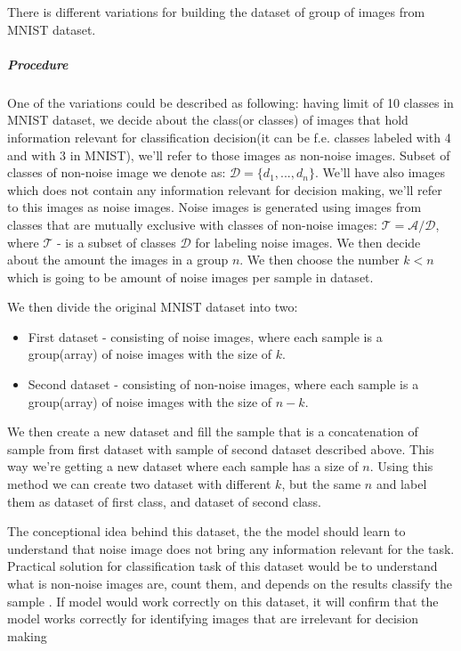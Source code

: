 {There is different variations for building the dataset of group of images from MNIST dataset.
\subparagraph{Procedure}
One of the variations could be described as following:
having limit of 10 classes in MNIST dataset, we decide about the class(or classes) of images
that hold information relevant for classification decision(it can be f.e. classes
labeled with 4 and with 3 in MNIST),
we'll refer to those images as non-noise images. Subset of classes of non-noise image
we denote as: $\mathcal{D} = \{d_1,..., d_n\}$.
We'll have also images which does not
contain any information relevant for decision making, we'll refer to this images
as noise images. Noise images is generated using images from classes that
are mutually exclusive with classes of non-noise images:
$\mathcal{T} = \mathcal{A} / \mathcal{D}$, where $\mathcal{T}$ - is a subset of classes $\mathcal{D}$
for labeling noise images.
We then decide about the amount the images in a group $n$.
We then choose the number $k < n $ which is going to be amount of noise images
per sample in dataset.


We then divide the original MNIST dataset into two:
\begin{itemize}
	\item First dataset - consisting of noise images, where each sample is a group(array)
		of noise images with the size of $k$.
	\item Second dataset - consisting of non-noise images, where each sample is a group(array)
		of noise images with the size of $n-k$.
\end{itemize}

We then create a new dataset and fill the sample that is a concatenation of sample
from first dataset with sample of second dataset described above.
This way we're getting a new dataset
where each sample has a size of $n$. Using this method we can create two dataset with
different $k$, but the same $n$ and label them as dataset of first class, and
dataset of second class.

The conceptional idea behind this dataset, the the model should learn to
understand that noise image does not bring any information relevant for the task.
Practical solution for classification task of this dataset would be
to understand what is non-noise images are,
count them, and depends on the results
classify the sample
. If model would work correctly on this dataset, it will confirm
 that the model works correctly
for identifying images that are irrelevant for decision making

}
